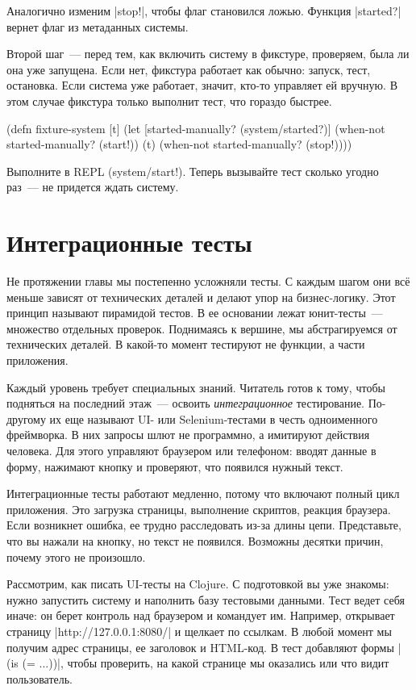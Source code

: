 Аналогично изменим \spverb|stop!|, чтобы флаг становился ложью. Функция
\spverb|started?| вернет флаг из метаданных системы.

Второй шаг~--- перед тем, как включить систему в фикстуре, проверяем, была ли
она уже запущена. Если нет, фикстура работает как обычно: запуск, тест,
остановка. Если система уже работает, значит, кто-то управляет ей вручную. В
этом случае фикстура только выполнит тест, что гораздо быстрее.

\begin{english}
  \begin{clojure}
(defn fixture-system [t]
  (let [started-manually? (system/started?)]
    (when-not started-manually?
      (start!))
    (t)
    (when-not started-manually?
      (stop!))))
  \end{clojure}
\end{english}

Выполните в REPL (system/start!). Теперь вызывайте тест сколько угодно раз~---
не придется ждать систему.

\section{Интеграционные тесты}

Не протяжении главы мы постепенно усложняли тесты. С каждым шагом они вс\"{е}
меньше зависят от технических деталей и делают упор на бизнес-логику. Этот
принцип называют пирамидой тестов. В ее основании лежат юнит-тесты~--- множество
отдельных проверок. Поднимаясь к вершине, мы абстрагируемся от технических
деталей. В какой-то момент тестируют не функции, а части приложения.

Каждый уровень требует специальных знаний. Читатель готов к тому, чтобы
подняться на последний этаж~--- освоить \emph{интеграционное}
тестирование. По-другому их еще называют UI- или Selenium-тестами в честь
одноименного фреймворка. В них запросы шлют не программно, а имитируют действия
человека. Для этого управляют браузером или телефоном: вводят данные в форму,
нажимают кнопку и проверяют, что появился нужный текст.

Интеграционные тесты работают медленно, потому что включают полный цикл
приложения. Это загрузка страницы, выполнение скриптов, реакция браузера. Если
возникнет ошибка, ее трудно расследовать из-за длины цепи. Представьте, что вы
нажали на кнопку, но текст не появился. Возможны десятки причин, почему этого не
произошло.

Рассмотрим, как писать UI-тесты на Clojure. С подготовкой вы уже знакомы: нужно
запустить систему и наполнить базу тестовыми данными. Тест ведет себя иначе: он
берет контроль над браузером и командует им. Например, открывает страницу
\spverb|http://127.0.0.1:8080/| и щелкает по ссылкам. В любой момент мы получим
адрес страницы, ее заголовок и HTML-код. В тест добавляют формы \spverb|(is (= ...))|,
чтобы проверить, на какой странице мы оказались или что видит пользователь.

